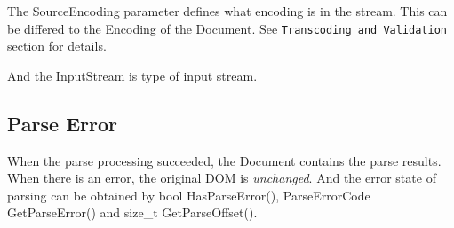 The {\ttfamily Source\+Encoding} parameter defines what encoding is in the stream. This can be differed to the {\ttfamily Encoding} of the {\ttfamily Document}. See \href{#TranscodingAndValidation}{\tt Transcoding and Validation} section for details.

And the {\ttfamily Input\+Stream} is type of input stream.\hypertarget{md_Cadriciel_Commun_Externe_RapidJSON_doc_dom.zh-cn_ParseError}{}\subsection{Parse Error}\label{md_Cadriciel_Commun_Externe_RapidJSON_doc_dom.zh-cn_ParseError}
When the parse processing succeeded, the {\ttfamily Document} contains the parse results. When there is an error, the original D\+OM is {\itshape unchanged}. And the error state of parsing can be obtained by {\ttfamily bool Has\+Parse\+Error()}, {\ttfamily Parse\+Error\+Code Get\+Parse\+Error()} and {\ttfamily size\+\_\+t Get\+Parse\+Offset()}.

